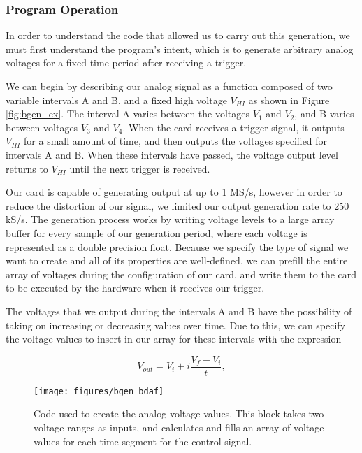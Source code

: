 \subsubsection{Program Operation}

In order to understand the code that allowed us to carry out this generation, we must first understand the program's intent, which is to generate arbitrary analog voltages for a fixed time period after receiving a trigger.

We can begin by describing our analog signal as a function composed of two variable intervals A and B, and a fixed high voltage $V_{HI}$ as shown in Figure \ref{fig:bgen_ex}. The interval A varies between the voltages $V_1$ and $V_2$, and B varies between voltages $V_3 $ and $V_4$.  When the card receives a trigger signal, it outputs $V_{HI}$ for a small amount of time, and then outputs the voltages specified for intervals A and B.  When these intervals have passed, the voltage output level returns to $V_{HI}$ until the next trigger is received.

Our card is capable of generating output at up to 1 MS/s,  however in order to reduce the distortion of our signal, we limited our output generation rate to 250 kS/s.  The generation process works by writing voltage levels to a large array buffer for every sample of our generation period, where each voltage is represented as a double precision float.  Because we specify the type of signal we want to create and all of its properties are well-defined, we can prefill the entire array of voltages during the configuration of our card, and write them to the card to be executed by the hardware when it receives our trigger.

The voltages that we output during the intervals A and B have the possibility of taking on increasing or decreasing values over time.  Due to this, we can specify the voltage values to insert in our array for these intervals with the expression 

\begin{equation}
  \label{eq:b_volt}
  V_{out} = V_{i} + i \frac{V_f - V_i}{t},
\end{equation}


\begin{figure}[!htb]
 \centering 
 \texttt{[image: figures/bgen\_bdaf]} 
 \caption[B-Field control generation code]{Code used to create the analog voltage values.  This block takes two voltage ranges as inputs, and calculates and fills an array of voltage values for each time segment for the control signal.} 
 \label{fig:bgen_bdaf} 
\end{figure}

